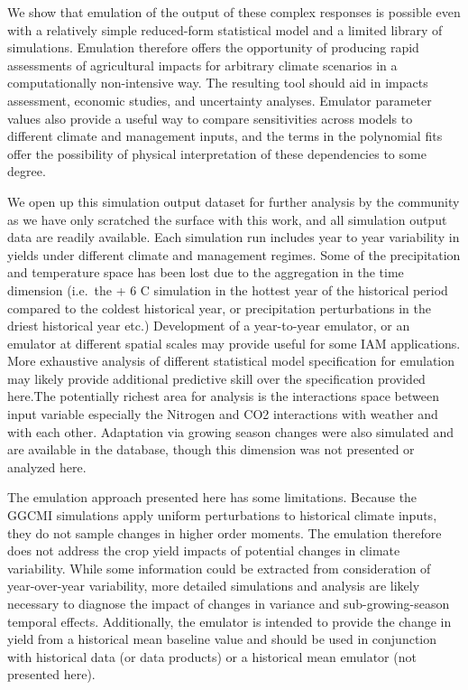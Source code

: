 \documentclass[preprint, 5p, times, twocolumn]{elsarticle}
\begin{document}
We show that emulation of the output of these complex responses is possible even with a relatively simple reduced-form statistical model and a limited library of simulations. Emulation therefore offers the opportunity of producing rapid assessments of agricultural impacts for arbitrary climate scenarios in a computationally non-intensive way. The resulting tool should aid in impacts assessment, economic studies, and uncertainty analyses. Emulator parameter values also provide a useful way to compare sensitivities across models to different climate and management inputs, and the terms in the polynomial fits offer the possibility of physical interpretation of these dependencies to some degree.

We open up this simulation output dataset for further analysis by the community as we have only scratched the surface with this work, and all simulation output data are readily available. Each simulation run includes year to year variability in yields under different climate and management regimes. Some of the precipitation and temperature space has been lost due to the aggregation in the time dimension (i.e.\ the + 6 C simulation in the hottest year of the historical period compared to the coldest historical year, or precipitation perturbations in the driest historical year etc.) Development of a year-to-year emulator, or an emulator at different spatial scales may provide useful for some IAM applications. More exhaustive analysis of different statistical model specification for emulation may likely provide additional predictive skill over the specification provided here.The potentially richest area for analysis is the interactions space between input variable especially the Nitrogen and CO2 interactions with weather and with each other. Adaptation via growing season changes were also simulated and are available in the database, though this dimension was not presented or analyzed here.

The emulation approach presented here has some limitations. Because the GGCMI simulations apply uniform perturbations to historical climate inputs, they do not sample changes in higher order moments. The emulation therefore does not address the crop yield impacts of potential changes in climate variability. While some information could be extracted from consideration of year-over-year variability, more detailed simulations and analysis are likely necessary to diagnose the impact of changes in variance and sub-growing-season temporal effects. Additionally, the emulator is intended to provide the change in yield from a historical mean baseline value and should be used in conjunction with historical data (or data products) or a historical mean emulator (not presented here).
\end{document}
